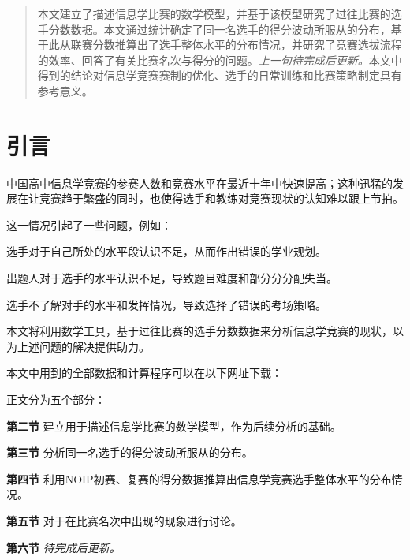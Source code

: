 \begin{abstract}
    本文建立了描述信息学比赛的数学模型，并基于该模型研究了过往比赛的选手分数数据。本文通过统计确定了同一名选手的得分波动所服从的分布，基于此从联赛分数推算出了选手整体水平的分布情况，并研究了竞赛选拔流程的效率、回答了有关比赛名次与得分的问题。\emph{上一句待完成后更新。}本文中得到的结论对信息学竞赛赛制的优化、选手的日常训练和比赛策略制定具有参考意义。
\end{abstract}

\section{引言}

    中国高中信息学竞赛的参赛人数和竞赛水平在最近十年中快速提高；这种迅猛的发展在让竞赛趋于繁盛的同时，也使得选手和教练对竞赛现状的认知难以跟上节拍。
    
    这一情况引起了一些问题，例如：

    \begin{asparaitem}
        \item {选手对于自己所处的水平段认识不足，从而作出错误的学业规划。}
        \item {出题人对于选手的水平认识不足，导致题目难度和部分分分配失当。}
        \item {选手不了解对手的水平和发挥情况，导致选择了错误的考场策略。}
    \end{asparaitem}

    本文将利用数学工具，基于过往比赛的选手分数数据来分析信息学竞赛的现状，以为上述问题的解决提供助力。

    \vspace{1.5ex}

    \begin{samepage}
        本文中用到的全部数据和计算程序可以在以下网址下载：\nobreak
        \begin{compactitem}
            \item {}
            \item {}
        \end{compactitem}
    \end{samepage}

    \vspace{1.5ex}

    正文分为五个部分：

    \begin{asparaenum}
        \item [\textbf{第二节}]{建立用于描述信息学比赛的数学模型，作为后续分析的基础。}
        \item [\textbf{第三节}]{分析同一名选手的得分波动所服从的分布。}
        \item [\textbf{第四节}]{利用NOIP初赛、复赛的得分数据推算出信息学竞赛选手整体水平的分布情况。}
        \item [\textbf{第五节}]{对于在比赛名次中出现的现象进行讨论。}
        \item [\textbf{第六节}]{\emph{待完成后更新。}}
    \end{asparaenum}


